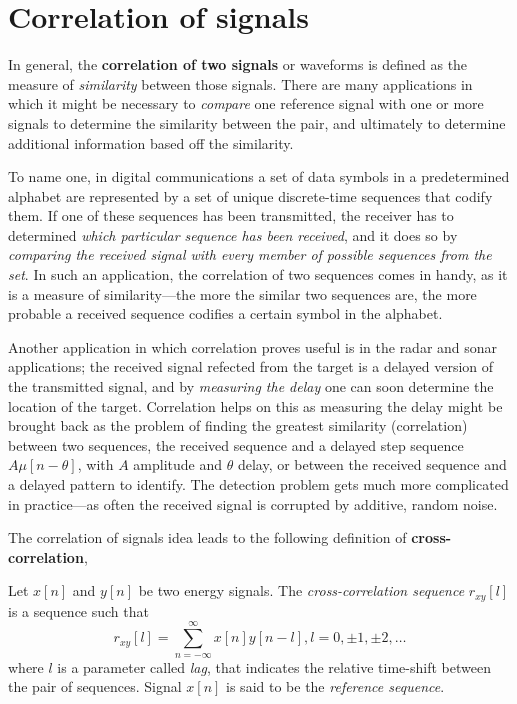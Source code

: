 \documentclass[\documentfontsize, twocolumn]{\classname}
\begin{document}
\section{Correlation of signals}

In general, the \textbf{correlation of two signals} or waveforms is defined as the measure of \emph{similarity} between those signals. There are many applications in which it might be necessary to \emph{compare} one reference signal with one or more signals to determine the similarity between the pair, and ultimately to determine additional information based off the similarity.

To name one, in digital communications a set of data symbols in a predetermined alphabet are represented by a set of unique discrete-time sequences that codify them. If one of these sequences has been transmitted, the receiver has to determined \emph{which particular sequence has been received}, and it does so by \emph{comparing the received signal with every member of possible sequences from the set}. In such an application, the correlation of two sequences comes in handy, as it is a measure of similarity---the more the similar two sequences are, the more probable a received sequence codifies a certain symbol in the alphabet.

Another application in which correlation proves useful is in the radar and sonar applications; the received signal refected from the target is a delayed version of the transmitted signal, and by \emph{measuring the delay} one can soon determine the location of the target. Correlation helps on this as measuring the delay might be brought back as the problem of finding the greatest similarity (correlation) between two sequences, the received sequence and a delayed step sequence $A\mu[n-\theta]$, with $A$ amplitude and $\theta$ delay, or between the received sequence and a delayed pattern to identify. The detection problem gets much more complicated in practice---as often the received signal is corrupted by additive, random noise.

The correlation of signals idea leads to the following definition of \textbf{cross-correlation},
\begin{defin}
    Let $x[n]$ and $y[n]$ be two energy signals. The \emph{cross-correlation sequence} $r_{xy}[l]$ is a sequence such that
    \begin{equation}\label{eqn:crossCorrelation}
        r_{xy}[l] = \sum_{n=-\infty}^\infty x[n]y[n-l], l = 0, \pm 1, \pm 2, \dots
    \end{equation}
    where $l$ is a parameter called \emph{lag}, that indicates the relative time-shift between the pair of sequences. Signal $x[n]$ is said to be the \emph{reference sequence}.
\end{defin}
\end{document}
